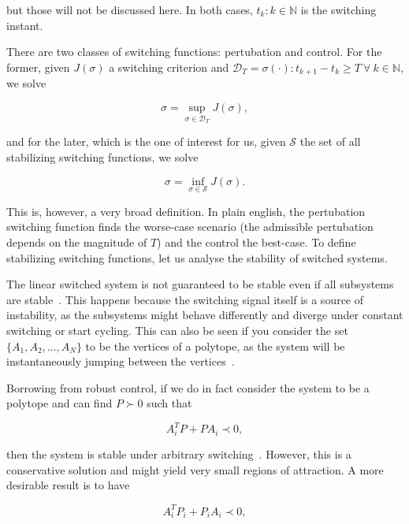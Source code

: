 but those will not be discussed here. In both cases, \(t_{k}:k\in\mathbb{N}\) is
the switching instant.

There are two classes of switching functions: pertubation and control. For the
former, given \(J(\sigma)\) a switching criterion and
\(\mathcal{D}_{T}=\sigma(\cdot):t_{k+1}-t_{k}\ge{}T~\forall{}~k\in{}\mathbb{N}\), we solve

\begin{equation}
	\sigma = \sup_{\sigma\in\mathcal{D}_{T}} J(\sigma),
\end{equation}

and for the later, which is the one of interest for us, given \(\mathcal{S}\)
the set of all stabilizing switching functions, we solve

\begin{equation}
	\sigma = \inf_{\sigma\in\mathcal{S}} J(\sigma).
\end{equation}

This is, however, a very broad definition. In plain english, the pertubation
switching function finds the worse-case scenario (the admissible pertubation
depends on the magnitude of \(T\)) and the control the best-case.  To define
stabilizing switching functions, let us analyse the stability of switched
systems.

The linear switched system is not guaranteed to be stable even if all subsystems
are stable~\parencite{liberzon.morse:basic}. This happens because the switching
signal itself is a source of instability, as the subsystems might behave
differently and diverge under constant switching or start cycling. This can also
be seen if you consider the set \(\{A_{1}, A_{2}, \ldots, A_{N}\}\) to be the
vertices of a polytope, as the system will be instantaneously jumping between
the vertices~\parencite{geromel.colaneri:stabilization}.

Borrowing from robust control, if we do in fact consider the system to be a
polytope and can find \(P\succ{}0\) such that

\begin{equation}
	A_{i}^{T}P+PA_{i} \prec{} 0,
\end{equation}

then the system is stable under arbitrary
switching~\parencite{geromel.deaecto:stability}. However, this is a conservative
solution and might yield very small regions of attraction. A more desirable
result is to have

\begin{equation}
	A_{i}^{T}P_{i}+P_{i}A_{i} \prec{} 0,
\end{equation}

